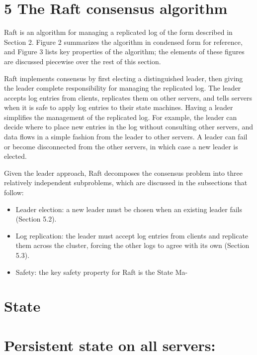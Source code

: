 \documentclass[
]{article}
\providecommand{\tightlist}{%
  \setlength{\itemsep}{0pt}\setlength{\parskip}{0pt}}
\begin{document}
\section{5 The Raft consensus
algorithm}\label{the-raft-consensus-algorithm}

Raft is an algorithm for managing a replicated log of the form described
in Section 2. Figure 2 summarizes the algorithm in condensed form for
reference, and Figure 3 lists key properties of the algorithm; the
elements of these figures are discussed piecewise over the rest of this
section.

Raft implements consensus by first electing a distinguished leader, then
giving the leader complete responsibility for managing the replicated
log. The leader accepts log entries from clients, replicates them on
other servers, and tells servers when it is safe to apply log entries to
their state machines. Having a leader simplifies the management of the
replicated log. For example, the leader can decide where to place new
entries in the log without consulting other servers, and data flows in a
simple fashion from the leader to other servers. A leader can fail or
become disconnected from the other servers, in which case a new leader
is elected.

Given the leader approach, Raft decomposes the consensus problem into
three relatively independent subproblems, which are discussed in the
subsections that follow:

\begin{itemize}
\tightlist
\item
  Leader election: a new leader must be chosen when an existing leader
  fails (Section 5.2).\\
\item
  Log replication: the leader must accept log entries from clients and
  replicate them across the cluster, forcing the other logs to agree
  with its own (Section 5.3).\\
\item
  Safety: the key safety property for Raft is the State Ma-
\end{itemize}

\section{State}\label{state}

\section{Persistent state on all
servers:}\label{persistent-state-on-all-servers}
\end{document}
